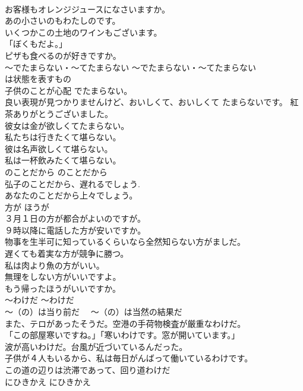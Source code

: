 \documentclass[8pt]{extreport}
\begin{document}
\begin{CJK}{UTF8}{min}
\\	お客様もオレンジジュースになさいますか。  
\\	あの小さいのもわたしのです。  
\\	いくつかこの土地のワインもございます。  
\\	「ぼくもだよ。」  
\\	ピザも食べるのが好きですか。  
\\	〜でたまらない・〜てたまらない	〜でたまらない・〜てたまらない	
\\	は状態を表すもの	
\\	子供のことが心配 でたまらない。  
\\	良い表現が見つかりませんけど、おいしくて、おいしくて たまらないです。 紅茶ありがとうございました。  
\\	彼女は金が欲しくてたまらない。  
\\	私たちは行きたくて堪らない。   
\\	彼は名声欲しくて堪らない。  
\\	私は一杯飲みたくて堪らない。  
\\	のことだから	のことだから	
\\	弘子のことだから、遅れるでしょう.   
\\	あなたのことだから上々でしょう。  
\\	方が	ほうが	
\\	３月１日の方が都合がよいのですが。  
\\	９時以降に電話した方が安いですか。  
\\	物事を生半可に知っているくらいなら全然知らない方がましだ。  
\\	遅くても着実な方が競争に勝つ。  
\\	私は肉より魚の方がいい。  
\\	無理をしない方がいいですよ。   
\\	もう帰ったほうがいいですか。  
\\	〜わけだ	〜わけだ	
\\	〜（の）は当り前だ　 〜（の）は当然の結果だ	
\\	また、テロがあったそうだ。空港の手荷物検査が厳重なわけだ。   
\\	「この部屋寒いですね。」「寒いわけです。窓が開いています。」   
\\	波が高いわけだ。台風が近づいているんだった。   
\\	子供が４人もいるから、私は毎日がんばって働いているわけです。  
\\	この道の辺りは渋滞であって、回り道わけだ  
\\	にひきかえ	にひきかえ	

\end{CJK}
\end{document}
